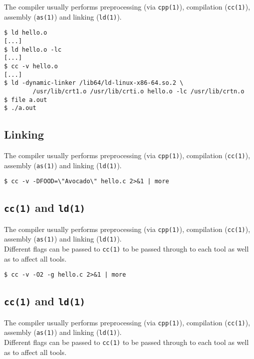 \documentclass[xga]{xdvislides}
\begin{document}
The compiler usually performs preprocessing (via {\tt cpp(1)}), compilation
({\tt cc(1)}), assembly ({\tt as(1)}) and linking ({\tt ld(1)}).

\begin{verbatim}
$ ld hello.o
[...]
$ ld hello.o -lc
[...]
$ cc -v hello.o
[...]
$ ld -dynamic-linker /lib64/ld-linux-x86-64.so.2 \
        /usr/lib/crt1.o /usr/lib/crti.o hello.o -lc /usr/lib/crtn.o
$ file a.out
$ ./a.out
\end{verbatim}

\subsection{Linking}

The compiler usually performs preprocessing (via {\tt cpp(1)}), compilation
({\tt cc(1)}), assembly ({\tt as(1)}) and linking ({\tt ld(1)}).

\begin{verbatim}
$ cc -v -DFOOD=\"Avocado\" hello.c 2>&1 | more
\end{verbatim}


\subsection{{\tt cc(1)} and {\tt ld(1)}}

The compiler usually performs preprocessing (via {\tt cpp(1)}), compilation
({\tt cc(1)}), assembly ({\tt as(1)}) and linking ({\tt ld(1)}).
\\

Different flags can be passed to {\tt cc(1)} to be passed through to each tool
as well as to affect all tools.  \\

\begin{verbatim}
$ cc -v -O2 -g hello.c 2>&1 | more
\end{verbatim}

\subsection{{\tt cc(1)} and {\tt ld(1)}}

The compiler usually performs preprocessing (via {\tt cpp(1)}), compilation
({\tt cc(1)}), assembly ({\tt as(1)}) and linking ({\tt ld(1)}).
\\

Different flags can be passed to {\tt cc(1)} to be passed through to each tool
as well as to affect all tools.  \\
\end{document}
